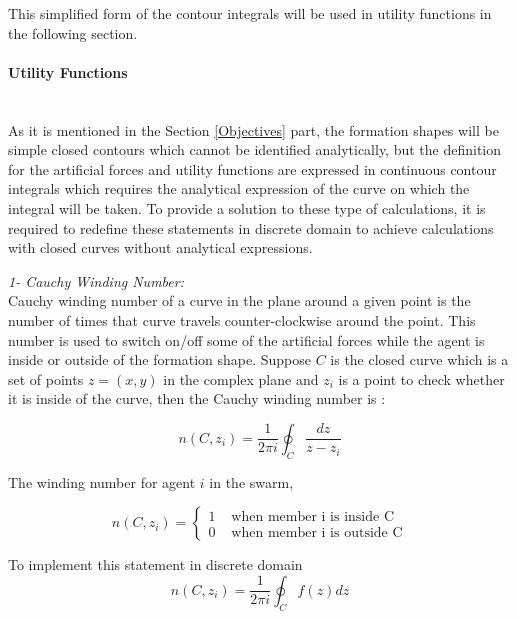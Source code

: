This simplified form of the contour integrals will be used in utility functions in the following section. 		
		
\paragraph{Utility Functions}\hspace{0pt} \\
As it is mentioned in the Section \ref{Objectives} part, the formation shapes will be simple closed contours which cannot be identified analytically, but the definition for the artificial forces and utility functions are expressed in continuous contour integrals which requires the analytical expression of the curve on which the integral will be taken. To provide a solution to  these type of calculations, it is required to redefine these statements in discrete domain to achieve calculations with closed curves without analytical expressions.  \\ \newline

\textit{ 		1- Cauchy Winding Number:} \\ 
Cauchy winding number of a curve in the plane around a given point is the number of times that curve travels counter-clockwise around the point. This number is used to switch on/off some of the artificial forces while the agent is inside or outside of the formation shape. Suppose $C$ is the closed curve which is a set of points $z=(x,y)$ in the complex plane  and $z_i$ is a point to check whether it is inside of the curve, then the Cauchy winding number is \cite{17} :
					
\begin{equation}
 n(C,z_i) = \frac{1}{2\pi i}\oint_C \frac{dz}{z-z_i}
\end{equation}
		
The winding number for agent $i$ in the swarm,

\begin{equation}
n(C,z_i) = \left\{ \begin{array}{rl}
1 &\mbox{ when member i is inside C} \\
0 &\mbox{ when member i is outside C}
\end{array} \right.
\end{equation}

To implement this statement in discrete domain 
\begin{equation}
n(C,z_i) = \frac{1}{2\pi i} \oint_C f(z)dz
\end{equation}


